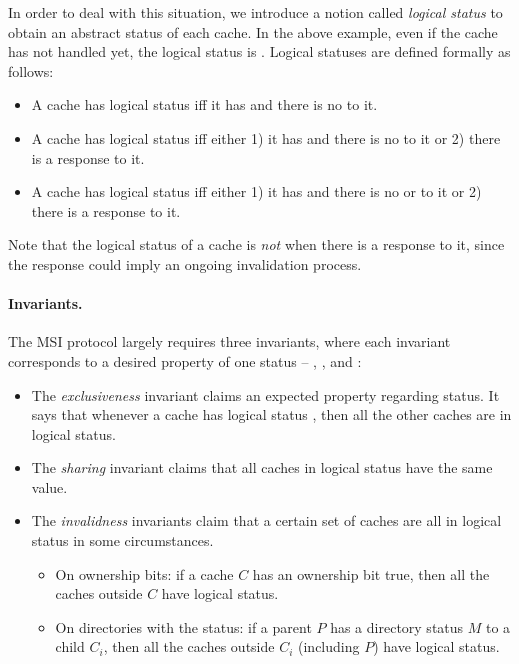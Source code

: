 \documentclass[sigplan,10pt,review,anonymous,screen]{acmart}\settopmatter{printfolios=true,printccs=false,printacmref=false}
\begin{document}
In order to deal with this situation, we introduce a notion called \emph{logical status} to obtain an abstract status of each cache.
In the above example, even if the cache has not handled  yet, the logical status is \stI{}.
Logical statuses are defined formally as follows:
\begin{itemize}[leftmargin=*]
\item A cache has logical status \stM{} iff it has \stM{} and there is no  to it.
\item A cache has logical status \stS{} iff either 1) it has \stS{} and there is no  to it or 2) there is a response  to it.
\item A cache has logical status \stI{} iff either 1) it has \stI{} and there is no  or  to it or 2) there is a response  to it.
\end{itemize}
Note that the logical status of a cache is \emph{not} \stM{} when there is a response  to it, since the response could imply an ongoing invalidation process.

\paragraph{Invariants.}
The MSI protocol largely requires three invariants, where each invariant corresponds to a desired property of one status -- \stM{}, \stS{}, and \stI{}:
\begin{itemize}[leftmargin=*]
\item The \emph{exclusiveness} invariant claims an expected property regarding \stM{} status.
  It says that whenever a cache has logical status \stM{}, then all the other caches are in logical \stI{} status.
\item The \emph{sharing} invariant claims that all caches in logical \stS{} status have the same value.
\item The \emph{invalidness} invariants claim that a certain set of caches are all in logical \stI{} status in some circumstances.
  \begin{itemize}[leftmargin=*]
  \item On ownership bits: if a cache $C$ has an ownership bit true, then all the caches outside $C$ have logical \stI{} status.
  \item On directories with the \stM{} status: if a parent $P$ has a directory status $M$ to a child $C_i$, then all the caches outside $C_i$ (including $P$) have logical \stI{} status.
  \end{itemize}
\end{itemize}
\end{document}

